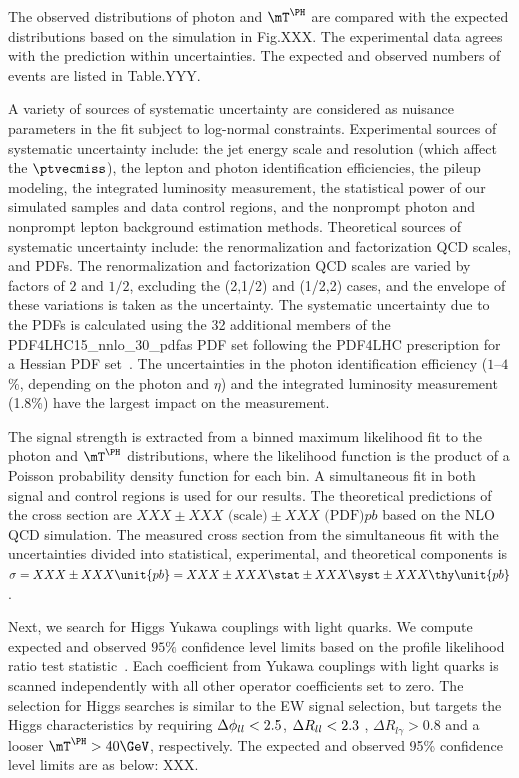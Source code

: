 \documentclass[11pt,twoside,a4paper,cmspaper]{cms-tdr}
\begin{document}
The observed distributions of photon \pt and $\mTH$ are compared with the expected distributions based on the \MGvATNLO simulation in Fig.XXX. The experimental data agrees with the prediction within uncertainties. The expected and observed numbers of events are listed in Table.YYY.

A variety of sources of systematic uncertainty are considered as nuisance parameters in the fit subject to log-normal constraints. Experimental sources of systematic uncertainty include: the jet energy scale and resolution (which affect the $\ptvecmiss$), the lepton and photon identification efficiencies, the pileup modeling, the integrated luminosity measurement, the statistical power of our simulated samples and data control regions, and the nonprompt photon and nonprompt lepton background estimation methods. Theoretical sources of systematic uncertainty include: the renormalization and factorization QCD scales, and PDFs. The renormalization and factorization QCD scales are varied by factors of $2$ and $1/2$, excluding the (2,1/2) and (1/2,2) cases, and the envelope of these variations is taken as the uncertainty. The systematic uncertainty due to the PDFs is calculated using the 32 additional members of the PDF4LHC15\_nnlo\_30\_pdfas PDF set following the PDF4LHC prescription for a Hessian PDF set~\cite{Butterworth_2016,Harland_Lang_2015,Ball_2015,PhysRevD.93.033006}. The uncertainties in the photon identification efficiency ($1$--$4$\%, depending on the photon \pt and $\eta$) and the integrated luminosity measurement (1.8\%) have the largest impact on the measurement.

The signal strength is extracted from a binned maximum likelihood fit to the photon \pt and $\mTH$ distributions, where the likelihood function is the product of a Poisson probability density function for each bin. A simultaneous fit in both signal and control regions is used for our results. The theoretical predictions of the cross section are $XXX \pm XXX \text{ (scale)} \pm XXX \text{ (PDF)} \unit{pb}$ based on the NLO QCD \MGvATNLO simulation. The measured cross section from the simultaneous fit with the uncertainties divided into statistical, experimental, and theoretical components is $\sigma = XXX \pm XXX \unit{pb} =XXX \pm XXX \stat \pm XXX \syst \pm XXX \thy \unit{pb}$. 

Next, we search for Higgs Yukawa couplings with light quarks. We compute expected and observed $95\%$ confidence level limits based on the profile likelihood ratio test statistic~\cite{CMS-NOTE-2011-005}. Each coefficient from  Yukawa couplings with light quarks is scanned independently with all other operator coefficients set to zero. The selection for Higgs searches is similar to the EW signal selection, but targets the Higgs characteristics by requiring $\Delta\phi_{ll}<2.5$, $\Delta R_{ll}<2.3$ , $\Delta R_{l\gamma} >0.8$ and a looser $\mTH > 40\GeV$, respectively. The expected and observed 95\% confidence level limits are as below: XXX.
\end{document}
